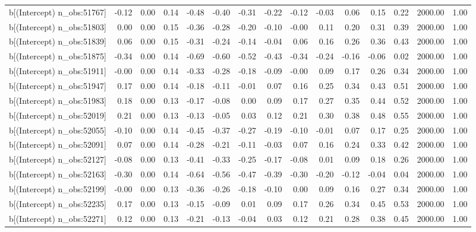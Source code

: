 \begin{table}[ht]
\begin{tabular}{rrrrrrrrrrrrrrr}
  b[(Intercept) n\_obs:51767] & -0.12 & 0.00 & 0.14 & -0.48 & -0.40 & -0.31 & -0.22 & -0.12 & -0.03 & 0.06 & 0.15 & 0.22 & 2000.00 & 1.00 \\ 
  b[(Intercept) n\_obs:51803] & 0.00 & 0.00 & 0.15 & -0.36 & -0.28 & -0.20 & -0.10 & -0.00 & 0.11 & 0.20 & 0.31 & 0.39 & 2000.00 & 1.00 \\ 
  b[(Intercept) n\_obs:51839] & 0.06 & 0.00 & 0.15 & -0.31 & -0.24 & -0.14 & -0.04 & 0.06 & 0.16 & 0.26 & 0.36 & 0.43 & 2000.00 & 1.00 \\ 
  b[(Intercept) n\_obs:51875] & -0.34 & 0.00 & 0.14 & -0.69 & -0.60 & -0.52 & -0.43 & -0.34 & -0.24 & -0.16 & -0.06 & 0.02 & 2000.00 & 1.00 \\ 
  b[(Intercept) n\_obs:51911] & -0.00 & 0.00 & 0.14 & -0.33 & -0.28 & -0.18 & -0.09 & -0.00 & 0.09 & 0.17 & 0.26 & 0.34 & 2000.00 & 1.00 \\ 
  b[(Intercept) n\_obs:51947] & 0.17 & 0.00 & 0.14 & -0.18 & -0.11 & -0.01 & 0.07 & 0.16 & 0.25 & 0.34 & 0.43 & 0.51 & 2000.00 & 1.00 \\ 
  b[(Intercept) n\_obs:51983] & 0.18 & 0.00 & 0.13 & -0.17 & -0.08 & 0.00 & 0.09 & 0.17 & 0.27 & 0.35 & 0.44 & 0.52 & 2000.00 & 1.00 \\ 
  b[(Intercept) n\_obs:52019] & 0.21 & 0.00 & 0.13 & -0.13 & -0.05 & 0.03 & 0.12 & 0.21 & 0.30 & 0.38 & 0.48 & 0.55 & 2000.00 & 1.00 \\ 
  b[(Intercept) n\_obs:52055] & -0.10 & 0.00 & 0.14 & -0.45 & -0.37 & -0.27 & -0.19 & -0.10 & -0.01 & 0.07 & 0.17 & 0.25 & 2000.00 & 1.00 \\ 
  b[(Intercept) n\_obs:52091] & 0.07 & 0.00 & 0.14 & -0.28 & -0.21 & -0.11 & -0.03 & 0.07 & 0.16 & 0.24 & 0.33 & 0.42 & 2000.00 & 1.00 \\ 
  b[(Intercept) n\_obs:52127] & -0.08 & 0.00 & 0.13 & -0.41 & -0.33 & -0.25 & -0.17 & -0.08 & 0.01 & 0.09 & 0.18 & 0.26 & 2000.00 & 1.00 \\ 
  b[(Intercept) n\_obs:52163] & -0.30 & 0.00 & 0.14 & -0.64 & -0.56 & -0.47 & -0.39 & -0.30 & -0.20 & -0.12 & -0.04 & 0.04 & 2000.00 & 1.00 \\ 
  b[(Intercept) n\_obs:52199] & -0.00 & 0.00 & 0.13 & -0.36 & -0.26 & -0.18 & -0.10 & 0.00 & 0.09 & 0.16 & 0.27 & 0.34 & 2000.00 & 1.00 \\ 
  b[(Intercept) n\_obs:52235] & 0.17 & 0.00 & 0.13 & -0.15 & -0.09 & 0.01 & 0.09 & 0.17 & 0.26 & 0.34 & 0.45 & 0.53 & 2000.00 & 1.00 \\ 
  b[(Intercept) n\_obs:52271] & 0.12 & 0.00 & 0.13 & -0.21 & -0.13 & -0.04 & 0.03 & 0.12 & 0.21 & 0.28 & 0.38 & 0.45 & 2000.00 & 1.00 \\ 

\end{tabular}
\end{table}
